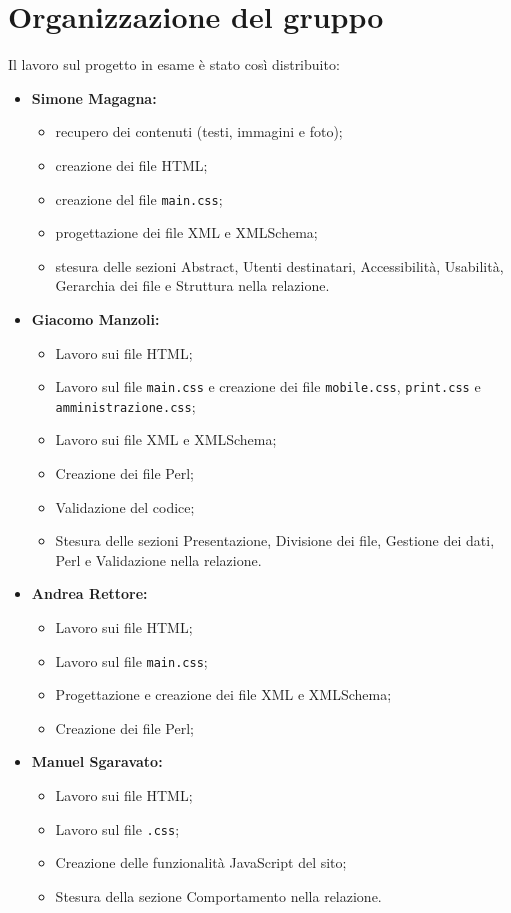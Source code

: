 \section{Organizzazione del gruppo}
Il lavoro sul progetto in esame è stato così distribuito:
\begin{itemize}
\item \textbf{Simone Magagna:}
\begin{itemize}
\item recupero dei contenuti (testi, immagini e foto);
\item creazione dei file HTML;
\item creazione del file \texttt{main.css};
\item progettazione dei file XML e XMLSchema;
\item stesura delle sezioni Abstract, Utenti destinatari, Accessibilità, Usabilità, Gerarchia dei file e Struttura nella relazione.
\end{itemize}

\item \textbf{Giacomo Manzoli:}
\begin{itemize}
\item Lavoro sui file HTML;
\item Lavoro sul file \texttt{main.css} e creazione dei file \texttt{mobile.css}, \texttt{print.css} e \texttt{amministrazione.css};
\item Lavoro sui file XML e XMLSchema;
\item Creazione dei file Perl;
\item Validazione del codice;
\item Stesura delle sezioni Presentazione, Divisione dei file, Gestione dei dati, Perl e Validazione nella relazione.
\end{itemize}


\item \textbf{Andrea Rettore:}
\begin{itemize}
\item Lavoro sui file HTML;
\item Lavoro sul file \texttt{main.css};
\item Progettazione e creazione dei file XML e XMLSchema;
\item Creazione dei file Perl;
\end{itemize}


\item \textbf{Manuel Sgaravato:}
\begin{itemize}
\item Lavoro sui file HTML;
\item Lavoro sul file \texttt{.css};
\item Creazione delle funzionalità JavaScript del sito;
\item Stesura della sezione Comportamento nella relazione.
\end{itemize}

\end{itemize}




